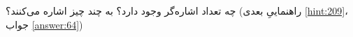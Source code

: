 \section{}
\paragraph{}\label{hint:154}
چه تعداد اشاره‌گر وجود دارد؟ به چند چیز اشاره می‌کنند؟ (راهنماییِ بعدی \ref{hint:209}، جواب \ref{answer:64})